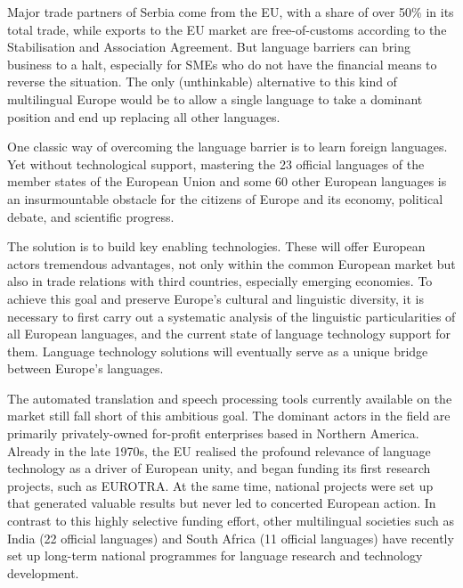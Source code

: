{\begin{multicols}{2}

Major trade partners of Serbia come from the EU, with a share of over 50\% in its total trade, while exports to the EU market are free-of-customs according to the Stabilisation and Association Agreement. But language barriers can bring business to a halt, especially for SMEs who do not have the financial means to reverse the situation. The only (unthinkable) alternative to this kind of multilingual Europe would be to allow a single language to take a dominant position and end up replacing all other languages. 

One classic way of overcoming the language barrier is to learn foreign languages. Yet without technological support, mastering the 23 official languages of the member states of the European Union and some 60 other European languages is an insurmountable obstacle for the citizens of Europe and its economy, political debate, and scientific progress.   

The solution is to build key enabling technologies. These will offer European actors tremendous advantages, not only within the common European market but also in trade relations with third countries, especially emerging economies.  To achieve this goal and preserve Europe’s cultural and linguistic diversity, it is necessary to first carry out a systematic analysis of the linguistic particularities of all European languages, and the current state of language technology support for them. Language technology solutions will eventually serve as a unique bridge between Europe’s languages. 


The automated translation and speech processing tools currently available on the market still fall short of this ambitious goal. The dominant actors in the field are primarily privately-owned for-profit enterprises based in Northern America. Already in the late 1970s, the EU realised the profound relevance of language technology as a driver of European unity, and began funding its first research projects, such as EUROTRA. At the same time, national projects were set up that generated valuable results but never led to concerted European action. In contrast to this highly selective funding effort, other multilingual societies such as India (22 official languages) and South Africa (11 official languages) have recently set up long-term national programmes for language research and technology development.
 

\end{multicols}}
